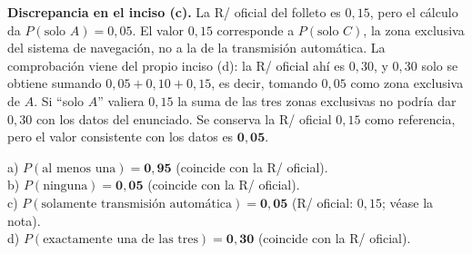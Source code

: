 \documentclass[11pt]{article}
\begin{document}
\begin{nota}
\textbf{Discrepancia en el inciso (c).} La R/ oficial del folleto es $0{,}15$, pero el cálculo da
$P(\text{solo }A)=0{,}05$. El valor $0{,}15$ corresponde a $P(\text{solo }C)$, la zona exclusiva del
sistema de navegación, no a la de la transmisión automática. La comprobación viene del propio inciso (d):
la R/ oficial ahí es $0{,}30$, y $0{,}30$ solo se obtiene sumando $0{,}05+0{,}10+0{,}15$, es decir,
tomando $0{,}05$ como zona exclusiva de $A$. Si ``solo $A$'' valiera $0{,}15$ la suma de las tres zonas
exclusivas no podría dar $0{,}30$ con los datos del enunciado. Se conserva la R/ oficial $0{,}15$ como
referencia, pero el valor consistente con los datos es $\mathbf{0{,}05}$.
\end{nota}

\begin{resp}
a) $P(\text{al menos una}) = \mathbf{0{,}95}$ (coincide con la R/ oficial).\\
b) $P(\text{ninguna}) = \mathbf{0{,}05}$ (coincide con la R/ oficial).\\
c) $P(\text{solamente transmisión automática}) = \mathbf{0{,}05}$ (R/ oficial: $0{,}15$; véase la nota).\\
d) $P(\text{exactamente una de las tres}) = \mathbf{0{,}30}$ (coincide con la R/ oficial).
\end{resp}
\end{document}
